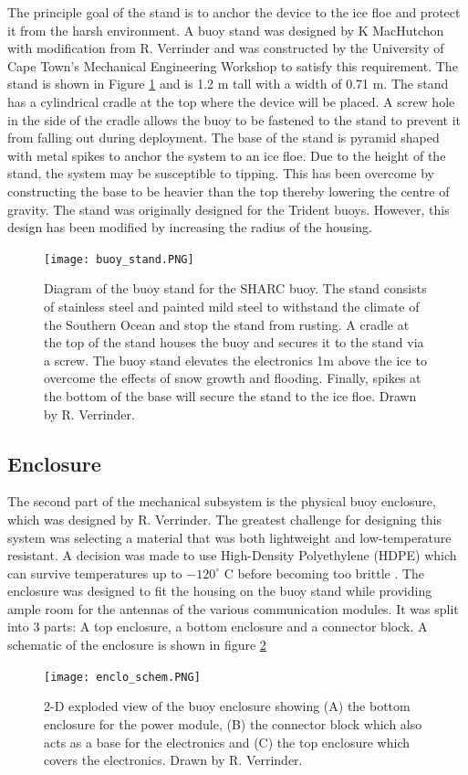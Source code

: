 The principle goal of the stand is to anchor the device to the ice floe and protect it from the harsh environment. A buoy stand was designed by K MacHutchon with modification from R. Verrinder and was constructed by the University of Cape Town's Mechanical Engineering Workshop to satisfy this requirement. The stand is shown in Figure \ref{fig:stand} and is 1.2 m tall with a width of 0.71 m. The stand has a cylindrical cradle at the top where the device will be placed. A screw hole in the side of the cradle allows the buoy to be fastened to the stand to prevent it from falling out during deployment. The base of the stand is pyramid shaped with metal spikes to anchor the system to an ice floe. Due to the height of the stand, the system may be susceptible to tipping. This has been overcome by constructing the base to be heavier than the top thereby lowering the centre of gravity. The stand was originally designed for the Trident buoys. However, this design has been modified by increasing the radius of the housing. 

\begin{figure}[H]
	\centering
	\texttt{[image: buoy\_stand.PNG]}
	\caption{Diagram of the buoy stand for the SHARC buoy. The stand consists of stainless steel and painted mild steel to withstand the climate of the Southern Ocean and stop the stand from rusting. A cradle at the top of the stand houses the buoy and secures it to the stand via a screw. The buoy stand elevates the electronics 1m above the ice to overcome the effects of snow growth and flooding. Finally, spikes at the bottom of the base will secure the stand to the ice floe. Drawn by R. Verrinder.}
	\label{fig:stand}
\end{figure}

\subsection{Enclosure}

The second part of the mechanical subsystem is the physical buoy enclosure, which was designed by R. Verrinder. The greatest challenge for designing this system was selecting a material that was both lightweight and low-temperature resistant. A decision was made to use High-Density Polyethylene (HDPE) which can survive temperatures up to $-120 ^\circ$ C before becoming too brittle \cite{drnovska2003surface}. The enclosure was designed to fit the housing on the buoy stand while providing ample room for the antennas of the various communication modules. It was split into 3 parts: A top enclosure, a bottom enclosure and a connector block. A schematic of the enclosure is shown in figure \ref{fig:enclo_schem}
\begin{figure}[H]
	\centering
	\texttt{[image: enclo\_schem.PNG]}
	\caption{2-D exploded view of the buoy enclosure showing (A) the bottom enclosure for the power module, (B) the connector block which also acts as a base for the electronics and (C) the top enclosure which covers the electronics. Drawn by R. Verrinder.}
	\label{fig:enclo_schem}
\end{figure}

